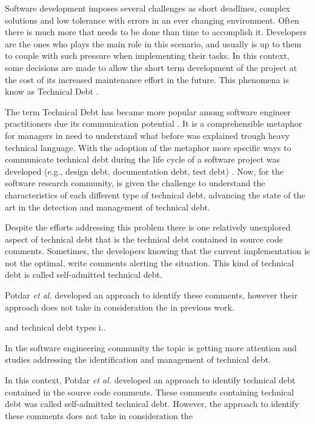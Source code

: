 Software development imposes several challenges as short deadlines, complex solutions and low tolerance with errors in an ever changing environment. Often there is much more that needs to be done than time to accomplish it. Developers are the ones who plays the main role in this scenario, and usually is up to them to couple with such pressure when implementing their tasks. In this context, some decisions are made to allow the short term development of the project at the cost of its increased maintenance effort in the future. This phenomena is know as Technical Debt \cite{Cunningham1992}. 

The term Technical Debt has became more popular among software engineer practitioners due its communication potential \cite{Spinola2013MTD}. It is a comprehensible metaphor for managers in need to understand what before was explained trough heavy technical language. With the adoption of the metaphor more specific ways to communicate technical debt during the life cycle of a software project was developed (e.g., design debt, documentation debt, test debt) \cite{Alves2014MTD}. Now, for the software research community, is given the challenge to understand the characteristics of each different type of technical debt, advancing the state of the art in the detection and management of technical debt.

Despite the efforts addressing this problem there is one relatively unexplored aspect of technical debt that is the technical debt contained in source code comments. Sometimes, the developers knowing that the current implementation is not the optimal, write comments alerting the situation. This kind of technical debt is called self-admitted technical debt. 

Potdar \textit{et al.} \cite{Potdar2014ICSME} developed an approach to identify these comments, however their approach does not take in consideration the  in previous work.  

and technical debt types  i.\cite{Kruchten2012}.


 In the software engineering community the topic is getting more attention and studies addressing the identification and management of technical debt. 

In this context, Potdar \textit{et al.} \cite{Potdar2014ICSME} developed an approach to identify technical debt contained in the source code comments. These comments containing technical debt was called  self-admitted technical debt. However, the approach to identify these comments does not take in consideration the 

